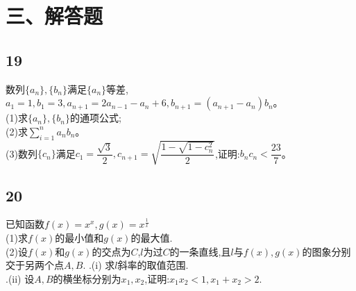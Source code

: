 \documentclass[fontset=windows]{article}
\begin{document}
\section{三、解答题}
\subsection{19}
数列$\{a_n\},\{b_n\}$满足$\{a_n\}$等差,$a_1=1,b_1=3,a_{n+1}=2a_{n-1}-a_n+6,b_{n+1}=(a_{n+1}-a_n)b_n$。\\
(1)求$\{a_n\},\{b_n\}$的通项公式;\\
(2)求$\displaystyle\sum\limits_{i=1}^{n}a_nb_n$。\\
(3)数列$\{c_n\}$满足$c_1=\dfrac{\sqrt3}2,
c_{n+1}=\sqrt{\dfrac{1-\sqrt{1-c_n^2}}{2}}$,证明:$b_nc_n<\dfrac{23}{7}$。
\subsection{20}
已知函数$f(x)=x^x,g(x)=x^\frac{1}{x}$\\
(1)求$f(x)$的最小值和$g(x)$的最大值.\\
(2)设$f(x)$和$g(x)$的交点为$C$,$l$为过$C$的一条直线,且$l$与$f(x),g(x)$的图象分别交于另两个点$A,B.$
.\qquad(i) 求$l$斜率的取值范围.\\
.\qquad(ii) 设$A,B$的横坐标分别为$x_1,x_2$,证明:$x_1x_2<1,x_1+x_2>2.$\\
\end{document}
